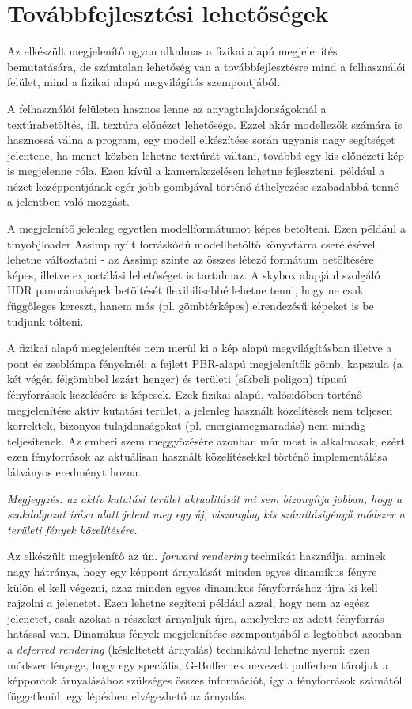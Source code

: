 \section{Továbbfejlesztési lehetőségek}

Az elkészült megjelenítő ugyan alkalmas a fizikai alapú megjelenítés bemutatására, de számtalan lehetőség van a továbbfejlesztésre mind a felhasználói felület, mind a fizikai alapú megvilágítás szempontjából.

A felhasználói felületen hasznos lenne az anyagtulajdonságoknál a textúrabetöltés, ill. textúra előnézet lehetősége. Ezzel akár modellezők számára is hasznossá válna a program, egy modell elkészítése során ugyanis nagy segítséget jelentene, ha menet közben lehetne textúrát váltani, továbbá egy kis előnézeti kép is megjelenne róla. Ezen kívül a kamerakezelésen lehetne fejleszteni, például a nézet középpontjának egér jobb gombjával történő áthelyezése szabadabbá tenné a jelentben való mozgást.

A megjelenítő jelenleg egyetlen modellformátumot képes betölteni. Ezen például a tinyobjloader Assimp nyílt forráskódú modellbetöltő könyvtárra cserélésével lehetne változtatni - az Assimp szinte az összes létező formátum betöltésére képes, illetve exportálási lehetőséget is tartalmaz. A skybox alapjául szolgáló HDR panorámaképek betöltését flexibilisebbé lehetne tenni, hogy ne csak függőleges kereszt, hanem más (pl. gömbtérképes) elrendezésű képeket is be tudjunk tölteni.

A fizikai alapú megjelenítés nem merül ki a kép alapú megvilágításban illetve a pont és zseblámpa fényeknél: a fejlett PBR-alapú megjelenítők gömb, kapszula (a két végén félgömbbel lezárt henger) és területi (síkbeli poligon) típusú fényforrások kezelésére is képesek. Ezek fizikai alapú, valósidőben történő megjelenítése aktív kutatási terület, a jelenleg használt közelítések nem teljesen korrektek, bizonyos tulajdonságokat (pl. energiamegmaradás) nem mindig teljesítenek. Az emberi szem meggyőzésére azonban már most is alkalmasak, ezért ezen fényforrások az aktuálisan használt közelítésekkel történő implementálása látványos eredményt hozna.

\textit{Megjegyzés: az aktív kutatási terület aktualitását mi sem bizonyítja jobban, hogy a szakdolgozat írása alatt jelent meg egy új, viszonylag kis számításigényű módszer a területi fények közelítésére. }

Az elkészült megjelenítő az ún. \textit{forward rendering} technikát használja, aminek nagy hátránya, hogy egy képpont árnyalását minden egyes dinamikus fényre külön el kell végezni, azaz minden egyes dinamikus fényforráshoz újra ki kell rajzolni a jelenetet. Ezen lehetne segíteni például azzal, hogy nem az egész jelenetet, csak azokat a részeket árnyaljuk újra, amelyekre az adott fényforrás hatással van. Dinamikus fények megjelenítése szempontjából a legtöbbet azonban a \textit{deferred rendering} (késleltetett árnyalás) technikával lehetne nyerni: ezen módszer lényege, hogy egy speciális, G-Buffernek nevezett pufferben tároljuk a képpontok árnyalásához szükséges összes információt, így a fényforrások számától függetlenül, egy lépésben elvégezhető az árnyalás.

